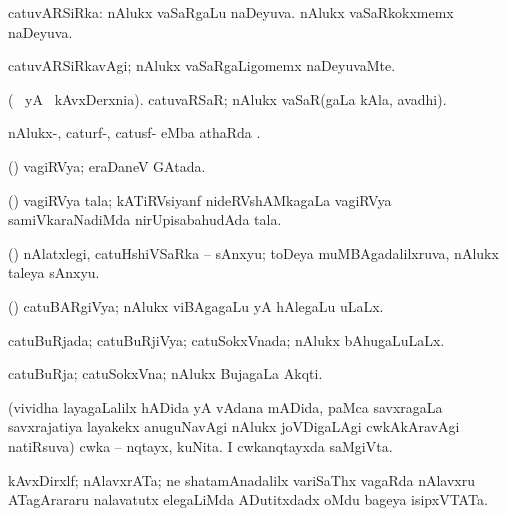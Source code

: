 \bentry
{}
\gl{\gu}
\bmng
catuvARSiRka: 
\banum
{} nAlukx vaSaRgaLu naDeyuva. 
 nAlukx vaSaRkokxmemx naDeyuva. 
\eanum
\emng
\eentry

\bentry
{}
\gl{\kirxvi}
\bmng
catuvARSiRkavAgi; nAlukx vaSaRgaLigomemx naDeyuvaMte. 
\emng
\eentry

\bentry
{}
\gl{\nA}
\bmng
(\bava\  yA  \ucAcx\ kAvxDerxnia). catuvaRSaR; nAlukx vaSaR(gaLa kAla, avadhi). 
\emng
\eentry

\bentry
{}
\gl{\sapUpa}
\bmng
nAlukx-, caturf-, catusf- eMba athaRda \sapUpa. 
\emng
\eentry

\bentry
{}
\gl{\gu}
\bmng
(\jAyx) vagiRVya; eraDaneV GAtada. 
\emng
\eentry


\bentry
{}
\gl{\nA}
\bmng
(\jAyx) vagiRVya tala; kATiRVsiyanf nideRVshAMkagaLa vagiRVya samiVkaraNadiMda nirUpisabahudAda tala. 
\emng
\eentry


\bentry
{} 
\gl{\nA}
\bmng
(\aMrashA) nAlatxlegi, catuHshiVSaRka -- sAnxyu; toDeya muMBAgadalilxruva, nAlukx taleya sAnxyu. 
\emng
\eentry


\bentry
{}
\gl{\gu}
\bmng
(\savi) catuBARgiVya; nAlukx viBAgagaLu yA hAlegaLu uLaLx. 
\emng
\eentry


\bentry
{}
\gl{\gu}
\bmng
catuBuRjada; catuBuRjiVya; catuSokxVnada; nAlukx bAhugaLuLaLx. 
\emng
\eentry

\bentry
{}
\gl{\nA}
\bmng
catuBuRja; catuSokxVna; nAlukx BujagaLa Akqti.  
\emng
\eentry

\bentry
{}
\gl{\nA}
\bmng
\banum
{} (vividha layagaLalilx hADida yA vAdana mADida, paMca savxragaLa savxrajatiya layakekx anuguNavAgi nAlukx joVDigaLAgi cwkAkAravAgi natiRsuva) cwka -- nqtayx, kuNita. 
 I cwkanqtayxda saMgiVta. 
\eanum
\emng
\eentry


\bentry
{}
\gl{\nA}
\bmng
kAvxDirxlf; nAlavxrATa; ne shatamAnadalilx variSaThx vagaRda nAlavxru ATagArararu nalavatutx elegaLiMda ADutitxdadx oMdu bageya isipxVTATa. 
\emng
\eentry

